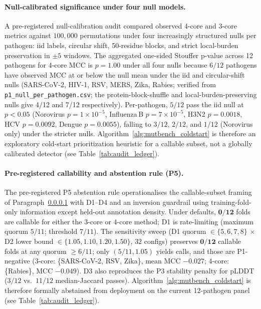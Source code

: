 \paragraph{Null-calibrated significance under four null models.}
\label{para:null_calibration}
A pre-registered null-calibration audit compared observed 4-core and 3-core metrics against $100{,}000$ permutations under four increasingly structured nulls per pathogen: iid labels, circular shift, 50-residue blocks, and strict local-burden preservation in $\pm 5$ windows. The aggregated one-sided Stouffer p-value across 12 pathogens for 4-core MCC is $p = 1.00$ under all four nulls because $6/12$ pathogens have observed MCC at or below the null mean under the iid and circular-shift nulls (SARS-CoV-2, HIV-1, RSV, MERS, Zika, Rabies; verified from \texttt{p1\_null\_per\_pathogen.csv}; the protein-block-shuffle and local-burden-preserving nulls give 4/12 and 7/12 respectively). Per-pathogen, $5/12$ pass the iid null at $p < 0.05$ (Norovirus $p = 1{\times}10^{-5}$, Influenza\,B $p = 7{\times}10^{-5}$, H3N2 $p = 0.0018$, HCV $p = 0.0092$, Dengue $p = 0.0055$), falling to $3/12$, $2/12$, and \emph{$1/12$} (Norovirus only) under the stricter nulls. Algorithm~\ref{alg:mutbench_coldstart} is therefore an exploratory cold-start prioritization heuristic for a callable subset, not a globally calibrated detector (see Table~\ref{tab:audit_ledger}).

\paragraph{Pre-registered callability and abstention rule (P5).}
\label{para:p5_callability}
The pre-registered P5 abstention rule operationalises the callable-subset framing of Paragraph~\ref{para:null_calibration} with D1--D4 and an inversion guardrail using training-fold-only information except held-out annotation density. Under defaults, $\mathbf{0/12}$ folds are callable for either the 3-core or 4-core method; D1 is rate-limiting (maximum quorum $5/11$; threshold $7/11$). The sensitivity sweep (D1 quorum $\in \{5,6,7,8\}$ $\times$ D2 lower bound $\in \{1.05, 1.10, 1.20, 1.50\}$, $32$ configs) preserves $\mathbf{0/12}$ callable folds at any quorum $\geq 6/11$; only $(5/11, 1.05)$ yields calls, and those are P1-negative (3-core: \{SARS-CoV-2, RSV, Zika\}, mean MCC $-0.027$; 4-core: \{Rabies\}, MCC $-0.049$). D3 also reproduces the P3 stability penalty for pLDDT ($3/12$ vs.\ $11/12$ median-Jaccard passes). Algorithm~\ref{alg:mutbench_coldstart} is therefore formally abstained from deployment on the current 12-pathogen panel (see Table~\ref{tab:audit_ledger}).

